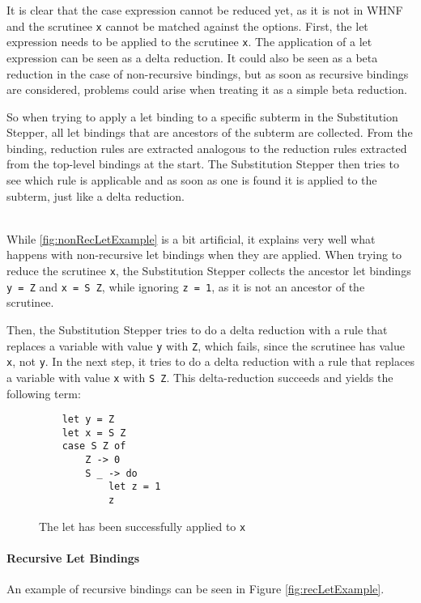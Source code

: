 It is clear that the case expression cannot be reduced yet,
as it is not in WHNF and the scrutinee \texttt{x} cannot be matched against the options.
First, the let expression needs to be applied to the scrutinee \texttt{x}.
The application of a let expression can be seen as a delta reduction.
It could also be seen as a beta reduction in the case of non-recursive bindings,
but as soon as recursive bindings are considered, problems could arise when treating it as a simple beta reduction.

So when trying to apply a let binding to a specific subterm in the Substitution Stepper,
all let bindings that are ancestors of the subterm are collected.
From the binding, reduction rules are extracted analogous to the reduction rules extracted from the top-level bindings at the start.
The Substitution Stepper then tries to see which rule is applicable
and as soon as one is found it is applied to the subterm, just like a delta reduction.

\ \\
While \ref*{fig:nonRecLetExample} is a bit artificial,
it explains very well what happens with non-recursive let bindings when they are applied.
When trying to reduce the scrutinee \texttt{x},
the Substitution Stepper collects the ancestor let bindings \texttt{y = Z} and \texttt{x = S Z},
while ignoring \texttt{z = 1}, as it is not an ancestor of the scrutinee.

Then, the Substitution Stepper tries to do a delta reduction with a rule that replaces a variable with value \texttt{y} with \texttt{Z},
which fails, since the scrutinee has value \texttt{x}, not \texttt{y}.
In the next step,
it tries to do a delta reduction with a rule that replaces a variable with value \texttt{x} with \texttt{S Z}.
This delta-reduction succeeds and yields the following term:

\begin{figure}[!ht]
\begin{verbatim}
    let y = Z
    let x = S Z
    case S Z of
        Z -> 0
        S _ -> do
            let z = 1
            z
\end{verbatim}
    \caption{The let has been successfully applied to \texttt{x}}
    \label{fig:nonRecLetExampleResolved}
\end{figure}

\paragraph*{Recursive Let Bindings}
An example of recursive bindings can be seen in Figure \ref*{fig:recLetExample}.

